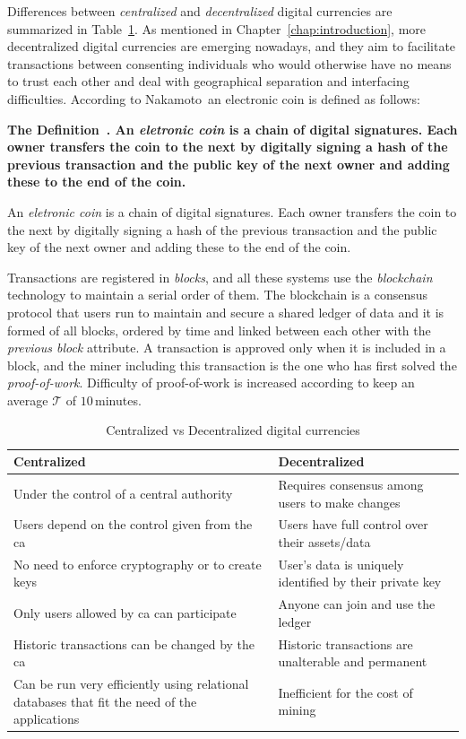 \documentclass[USenglish]{uit-thesis}
\newcommand{\definition}[1]{%
  \refstepcounter{definition}%
  \par\noindent\textbf{The Definition~\thedefinition. #1}%
  \addcontentsline{def}{definition}
    {\protect\numberline{\thechapter.\thedefinition}#1}\par%
}
\begin{document}
Differences between \emph{centralized}
and \emph{decentralized} digital currencies
are summarized in Table~\ref{tab:centralized_vs_decentralized}.
As mentioned in Chapter~\ref{chap:introduction}, more decentralized
digital currencies are emerging nowadays, and they aim
to facilitate transactions between consenting individuals who would otherwise
have no means to trust each other and deal with geographical separation and 
interfacing difficulties.
According to Nakamoto\,\cite{Nakamoto_bitcoin} an electronic coin is defined as
follows:
\definition{An \emph{eletronic coin} is a chain of digital signatures.
	Each owner transfers the coin to the next by digitally signing a hash of
	the previous transaction and the public key of the next owner and adding
	these to the end of the coin.}
Transactions are registered in \emph{blocks}, and all these systems use the
\emph{blockchain} technology to maintain a serial order of them.
The blockchain is a consensus protocol that users run to maintain and secure a
shared ledger of data and it is formed of all blocks, ordered by time and linked
between each other with the \emph{previous block} attribute. A transaction is approved
only when it is included in a block, and the miner including this transaction is
the one who has first
solved the \emph{proof-of-work}. Difficulty of proof-of-work is increased
according to keep an average $\mathcal{T}$ of $10$\,minutes.
\begin{table}
	\caption{Centralized vs Decentralized digital currencies}
	\label{tab:centralized_vs_decentralized}
	\centering 
	\begin{tabular}{|p{5.8cm}|p{5.8cm}|}\hline
		\textbf{Centralized}&\textbf{Decentralized}\\
		\hline
		Under the control of a central authority & Requires
		consensus among users to make changes\\
		\hline
		Users depend on the control given from the
		\gls{ca} & Users have full control over their assets/data\\
		\hline
		No need to enforce cryptography or to create keys & User’s data is uniquely identified by their private key \\
		\hline
		Only users allowed by \gls{ca} can participate & Anyone can join and use the ledger \\
		\hline
		Historic transactions can be changed by the \gls{ca} &
		Historic transactions are unalterable and permanent\\
		\hline
		Can be run very efficiently using relational
		databases that fit the need of the applications & Inefficient
		for the cost of mining \\
		\hline		
	\end{tabular}
\end{table}
\end{document}
